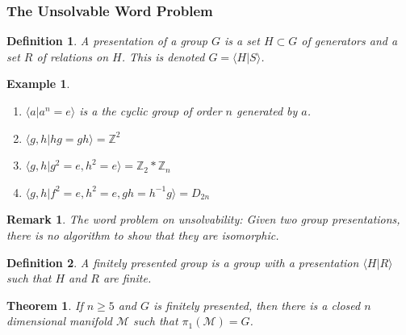 \documentclass[oneside]{book}
\theoremstyle{mystyle}
\newtheorem{theorem}{Theorem}[section]
\newtheorem{definition}{Definition}[section]
\newtheorem{example}{Example}[section]
\newtheorem{remark}{Remark}[section]
\begin{document}
\subsubsection{The Unsolvable Word Problem}
\begin{definition}
A presentation of a group $G$ is a set $H\subset G$ of generators and a set $R$ of relations on $H$. This is denoted $G = \langle H|S\rangle$.
\end{definition}
\begin{example}
\begin{enumerate}
    \item $\langle a | a^{n} = e\rangle$ is a the cyclic group of order $n$ generated by $a$.
    \item $\langle g,h|hg = gh\rangle = \mathbb{Z}^{2}$
    \item $\langle g,h|g^{2} = e, h^{2} = e\rangle = \mathbb{Z}_{2}*\mathbb{Z}_{n}$
    \item $\langle g,h|f^{2} = e,h^{2} = e, gh=h^{-1}g\rangle = D_{2n}$
\end{enumerate}
\end{example}
\begin{remark}
The word problem on unsolvability: Given two group presentations, there is no algorithm to show that they are isomorphic.
\end{remark}
\begin{definition}
A finitely presented group is a group with a presentation $\langle H|R\rangle$ such that $H$ and $R$ are finite.
\end{definition}
\begin{theorem}
If $n\geq 5$ and $G$ is finitely presented, then there is a closed $n$ dimensional manifold $\mathcal{M}$ such that $\pi_{1}(\mathcal{M}) = G$.
\end{theorem}
\end{document}

